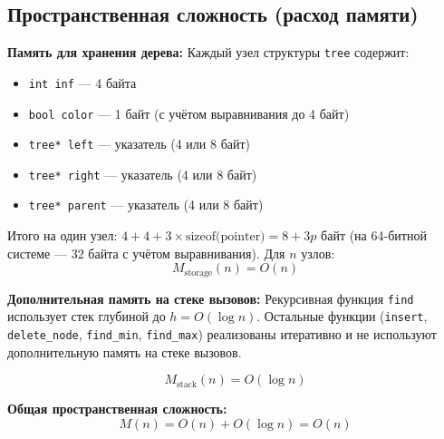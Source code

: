 \documentclass[otchet]{SCWorks}
\begin{document}
\subsection*{Пространственная сложность (расход памяти)}

\textbf{Память для хранения дерева:}
Каждый узел структуры \texttt{tree} содержит:
\begin{itemize}
    \item \texttt{int inf} — 4 байта
    \item \texttt{bool color} — 1 байт (с учётом выравнивания до 4 байт)
    \item \texttt{tree* left} — указатель (4 или 8 байт)
    \item \texttt{tree* right} — указатель (4 или 8 байт)
    \item \texttt{tree* parent} — указатель (4 или 8 байт)
\end{itemize}
Итого на один узел: \(4 + 4 + 3 \times \text{sizeof(pointer)} = 8 + 3p\) байт (на 64-битной системе — 32 байта с учётом выравнивания). Для \(n\) узлов:
\[
M_{\text{storage}}(n) = O(n)
\]

\textbf{Дополнительная память на стеке вызовов:}
Рекурсивная функция \texttt{find} использует стек глубиной до \(h = O(\log n)\). Остальные функции (\texttt{insert}, \texttt{delete\_node}, \texttt{find\_min}, \texttt{find\_max}) реализованы итеративно и не используют дополнительную память на стеке вызовов.

\[
M_{\text{stack}}(n) = O(\log n)
\]

\textbf{Общая пространственная сложность:}
\[
M(n) = O(n) + O(\log n) = O(n)
\]
\end{document}
